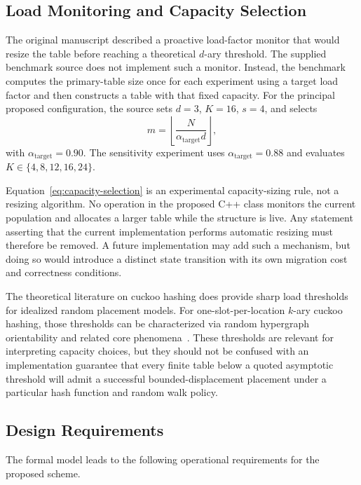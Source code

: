 \documentclass[conference]{IEEEtran}
\begin{document}
\subsection{Load Monitoring and Capacity Selection}

The original manuscript described a proactive load-factor monitor that would resize the table before reaching a theoretical $d$-ary threshold. The supplied benchmark source does not implement such a monitor. Instead, the benchmark computes the primary-table size once for each experiment using a target load factor and then constructs a table with that fixed capacity. For the principal proposed configuration, the source sets $d=3$, $K=16$, $s=4$, and selects
\begin{equation}
    m=\left\lfloor\frac{N}{\alpha_{\mathrm{target}}d}\right\rfloor,
    \label{eq:capacity-selection}
\end{equation}
with $\alpha_{\mathrm{target}}=0.90$. The sensitivity experiment uses $\alpha_{\mathrm{target}}=0.88$ and evaluates $K\in\{4,8,12,16,24\}$.

Equation~\eqref{eq:capacity-selection} is an experimental capacity-sizing rule, not a resizing algorithm. No operation in the proposed C++ class monitors the current population and allocates a larger table while the structure is live. Any statement asserting that the current implementation performs automatic resizing must therefore be removed. A future implementation may add such a mechanism, but doing so would introduce a distinct state transition with its own migration cost and correctness conditions.

The theoretical literature on cuckoo hashing does provide sharp load thresholds for idealized random placement models. For one-slot-per-location $k$-ary cuckoo hashing, those thresholds can be characterized via random hypergraph orientability and related core phenomena~\cite{fountoulakis2012sharp,dietzfelbinger2009tight}. These thresholds are relevant for interpreting capacity choices, but they should not be confused with an implementation guarantee that every finite table below a quoted asymptotic threshold will admit a successful bounded-displacement placement under a particular hash function and random walk policy.

\subsection{Design Requirements}

The formal model leads to the following operational requirements for the proposed scheme.
\end{document}
